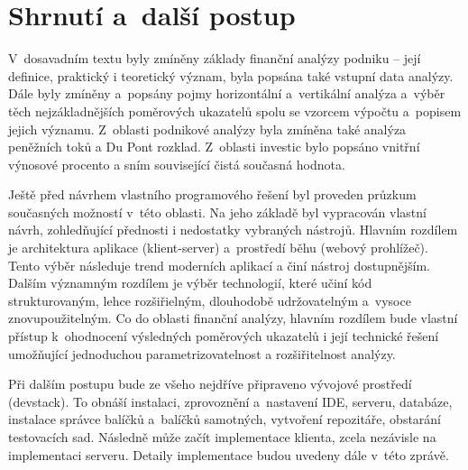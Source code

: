 \section{Shrnutí a~další postup}
V~dosavadním textu byly zmíněny základy finanční analýzy podniku -- její definice, praktický i teoretický význam, byla popsána také vstupní data analýzy. Dále byly zmíněny a~popsány pojmy horizontální a~vertikální analýza a~výběr těch nejzákladnějších poměrových ukazatelů spolu se vzorcem výpočtu a~popisem jejich významu. Z~oblasti podnikové analýzy byla zmíněna také analýza peněžních toků a Du Pont rozklad. Z~oblasti investic bylo popsáno vnitřní výnosové procento a sním související čistá současná hodnota.

Ještě před návrhem vlastního programového řešení byl proveden průzkum současných možností v~této oblasti. Na jeho základě byl vypracován vlastní návrh, zohledňující přednosti i nedostatky vybraných nástrojů. Hlavním rozdílem je architektura aplikace (klient-server) a~prostředí běhu (webový prohlížeč). Tento výběr následuje trend moderních aplikací a činí nástroj dostupnějším. Dalším významným rozdílem je výběr technologií, které učiní kód strukturovaným, lehce rozšiřielným, dlouhodobě udržovatelným a~vysoce znovupoužitelným. Co do oblasti finanční analýzy, hlavním rozdílem bude vlastní přístup k~ohodnocení výsledných poměrových ukazatelů i její technické řešení umožňující jednoduchou parametrizovatelnost a rozšiřitelnost analýzy.

Při dalším postupu bude ze všeho nejdříve připraveno vývojové prostředí (devstack). To obnáší instalaci, zprovoznění a~nastavení IDE, serveru, databáze, instalace správce balíčků a~balíčků samotných, vytvoření repozitáře, obstarání testovacích sad. Následně může začít implementace klienta, zcela nezávisle na implementaci serveru. Detaily implementace budou uvedeny dále v~této zprávě.





















































